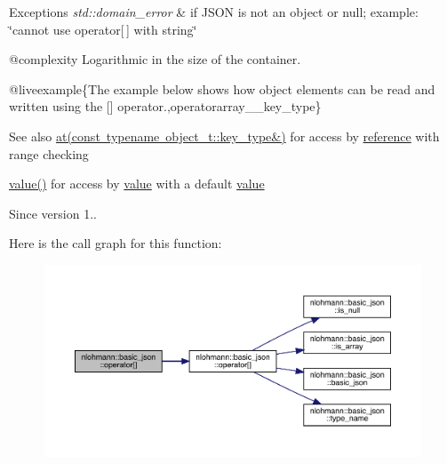 \begin{DoxyExceptions}{Exceptions}
{\em std\+::domain\+\_\+error} & if J\+S\+ON is not an object or null; example\+: {\ttfamily \char`\"{}cannot use operator\mbox{[}$\,$\mbox{]} with string\char`\"{}}\\
\hline
\end{DoxyExceptions}
@complexity Logarithmic in the size of the container.

@liveexample\{The example below shows how object elements can be read and written using the {\ttfamily \mbox{[}\mbox{]}} operator.,operatorarray\+\_\+\+\_\+key\+\_\+type\}

\begin{DoxySeeAlso}{See also}
\mbox{\hyperlink{classnlohmann_1_1basic__json_a93403e803947b86f4da2d1fb3345cf2c}{at(const typename object\+\_\+t\+::key\+\_\+type\&)}} for access by \mbox{\hyperlink{classnlohmann_1_1basic__json_ac6a5eddd156c776ac75ff54cfe54a5bc}{reference}} with range checking 

\mbox{\hyperlink{classnlohmann_1_1basic__json_af9c51328fbe1da75eca750be3009917a}{value()}} for access by \mbox{\hyperlink{classnlohmann_1_1basic__json_af9c51328fbe1da75eca750be3009917a}{value}} with a default \mbox{\hyperlink{classnlohmann_1_1basic__json_af9c51328fbe1da75eca750be3009917a}{value}}
\end{DoxySeeAlso}
\begin{DoxySince}{Since}
version 1.. 
\end{DoxySince}
Here is the call graph for this function\+:
\nopagebreak
\begin{figure}[H]
\begin{center}
\leavevmode
\includegraphics[width=350pt]{classnlohmann_1_1basic__json_a1416bbec9d9a8eeca21c213cf5290868_cgraph}
\end{center}
\end{figure}
\mbox{\label{classnlohmann_1_1basic__json_ab17b18f161ecd014074790e25449094a}} 
